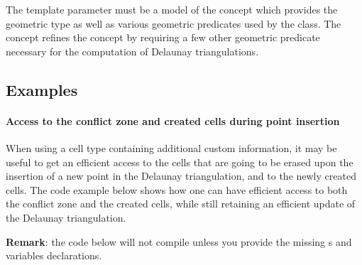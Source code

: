 The template parameter  must be a model of the concept
 which provides the geometric  type as
well as various geometric predicates used by the  class.
The concept  refines the concept
 by requiring a few other geometric predicate necessary
for the computation of Delaunay triangulations.


\subsection{Examples}

\paragraph{Access to the conflict zone and created cells during point
insertion}

When using a cell type containing additional custom information, it may be
useful to get an efficient access to the cells that are going to be erased
upon the insertion of a new point in the Delaunay triangulation, and to the newly
created cells. The code example below shows how one can have efficient
access to both the conflict zone and the created cells, while still
retaining an efficient update of the Delaunay triangulation.

\textbf{Remark}: the code below will not compile unless you provide the
missing s and variables declarations.

